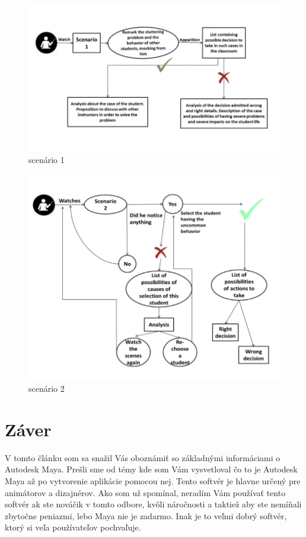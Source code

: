 \documentclass[10pt,oneside,slovak,a4paper]{article}
\begin{document}
\begin{figure}[h]
\centering
\includegraphics[scale=0.37]{scenario 1.png}
\caption{scenário 1\cite{studies}}
\label{f:scenario1}
\end{figure}
\begin{figure}[h]
\centering
\includegraphics[scale=0.37]{scenario 2.png}
\caption{scenário 2\cite{studies}}
\label{f:scenario2}
\end{figure}




\section{Záver} \label{zaver}

V tomto článku som sa snažil Vás oboznámiť so základnými informáciami o Autodesk Maya. Prešli sme od témy kde som Vám vysvetloval čo to je Autodesk Maya až po vytvorenie aplikácie pomocou nej. Tento softvér je hlavne určený pre animátorov a dizajnérov. Ako som už spomínal, neradím Vám používať tento softvér ak ste nováčik v tomto odbore, kvôli náročnosti a taktiež aby ste nemíňali zbytočne peniazmi, lebo Maya nie je zadarmo. Inak je to veľmi dobrý softvér, ktorý si veľa používateľov pochvaľuje. 
\end{document}
